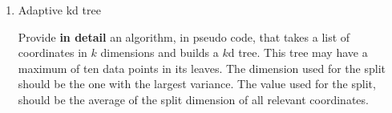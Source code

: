 \begin{enumerate}
\item
Adaptive kd tree

Provide \textbf{in detail} an algorithm, in pseudo code, that takes a list of coordinates in $k$ dimensions and builds a $k$d tree.
This tree may have a maximum of ten data points in its leaves.
The dimension used for the split should be the one with the largest variance.
The value used for the split, should be the average of the split dimension of all relevant coordinates.

\end{enumerate}


